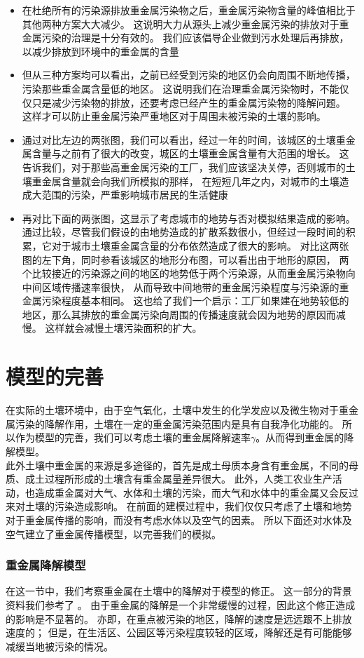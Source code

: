 \documentclass[a4paper]{article}
\begin{document}
\begin{itemize}
\item 在杜绝所有的污染源排放重金属污染物之后，重金属污染物含量的峰值相比于其他两种方案大大减少。
这说明大力从源头上减少重金属污染的排放对于重金属污染的治理是十分有效的。
我们应该倡导企业做到污水处理后再排放，以减少排放到环境中的重金属的含量
\item 但从三种方案均可以看出，之前已经受到污染的地区仍会向周围不断地传播，污染那些重金属含量低的地区。
这说明我们在治理重金属污染物时，不能仅仅只是减少污染物的排放，还要考虑已经产生的重金属污染物的降解问题。
这样才可以防止重金属污染严重地区对于周围未被污染的土壤的影响。
\item 通过对比左边的两张图，我们可以看出，经过一年的时间，该城区的土壤重金属含量与之前有了很大的改变，城区的土壤重金属含量有大范围的增长。
这告诉我们，对于那些高重金属污染的工厂，我们应该坚决关停，否则城市的土壤重金属含量就会向我们所模拟的那样，
在短短几年之内，对城市的土壤造成大范围的污染，严重影响城市居民的生活健康
\item 再对比下面的两张图，这显示了考虑城市的地势与否对模拟结果造成的影响。
通过比较，尽管我们假设的由地势造成的扩散系数很小，但经过一段时间的积累，它对于城市土壤重金属含量的分布依然造成了很大的影响。
对比这两张图的左下角，同时参看该城区的地形分布图，可以看出由于地形的原因，
两个比较接近的污染源之间的地区的地势低于两个污染源，从而重金属污染物向中间区域传播速率很快，
从而导致中间地带的重金属污染程度与污染源的重金属污染程度基本相同。
这也给了我们一个启示：工厂如果建在地势较低的地区，那么其排放的重金属污染向周围的传播速度就会因为地势的原因而减慢。
这样就会减慢土壤污染面积的扩大。
\end{itemize}
\part{模型的完善}
在实际的土壤环境中，由于空气氧化，土壤中发生的化学发应以及微生物对于重金属污染的降解作用，土壤在一定的重金属污染范围内是具有自我净化功能的。
所以作为模型的完善，我们可以考虑土壤的重金属降解速率$\gamma$。从而得到重金属的降解模型。 \\
\indent 此外土壤中重金属的来源是多途径的，首先是成土母质本身含有重金属，不同的母质、成土过程所形成的土壤含有重金属量差异很大。
此外，人类工农业生产活动，也造成重金属对大气、水体和土壤的污染，而大气和水体中的重金属又会反过来对土壤的污染造成影响。
在前面的建模过程中，我们仅仅只考虑了土壤和地势对于重金属传播的影响，而没有考虑水体以及空气的因素。
所以下面还对水体及空气建立了重金属传播模型，以完善我们的模拟。
\section{重金属降解模型}
在这一节中，我们考察重金属在土壤中的降解对于模型的修正。
这一部分的背景资料我们参考了 \cite{art:jiangjie} 。
由于重金属的降解是一个非常缓慢的过程，因此这个修正造成的影响是不显著的。
亦即，在重点被污染的地区，降解的速度是远远跟不上排放速度的；
但是，在生活区、公园区等污染程度较轻的区域，降解还是有可能能够减缓当地被污染的情况。
\end{document}
